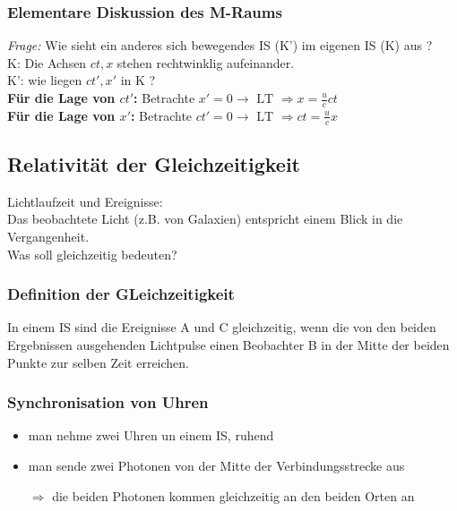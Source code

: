 \documentclass[titlepage,11pt,a4paper,ngerman]{report}
\newcommand{\tx}[1]{\textrm{#1}}
\begin{document}
\subsubsection{Elementare Diskussion des M-Raums}
\emph{Frage:} Wie sieht ein anderes sich bewegendes IS (K') im eigenen IS (K) aus ?\\[5pt]
K: Die Achsen $ ct, x $ stehen rechtwinklig aufeinander.\\
K': wie liegen $ ct', x' $ in K ?\\[5pt]
\textbf{Für die Lage von $ ct' $:}
Betrachte $ x' = 0 \rightarrow \tx{ LT } \Rightarrow x = \frac{u}{c} ct $\\
\textbf{Für die Lage von $ x' $:}
Betrachte $ ct' = 0 \rightarrow \tx{ LT } \Rightarrow ct = \frac{u}{c}x $

\subsection{Relativität der Gleichzeitigkeit}
Lichtlaufzeit und Ereignisse:\\
Das beobachtete Licht (z.B. von Galaxien) entspricht einem Blick in die Vergangenheit.\\
Was soll gleichzeitig bedeuten?

\subsubsection{Definition der GLeichzeitigkeit}
In einem IS sind die Ereignisse A und C gleichzeitig, wenn die von den beiden Ergebnissen ausgehenden Lichtpulse einen Beobachter B in der Mitte der beiden Punkte zur selben Zeit erreichen.

\subsubsection{Synchronisation von Uhren}
\begin{itemize}
	\item man nehme zwei Uhren un einem IS, ruhend
	\item man sende zwei Photonen von der Mitte der Verbindungsstrecke aus
	\item[$ \Rightarrow $] die beiden Photonen kommen gleichzeitig an den beiden Orten an
\end{itemize}
\end{document}
